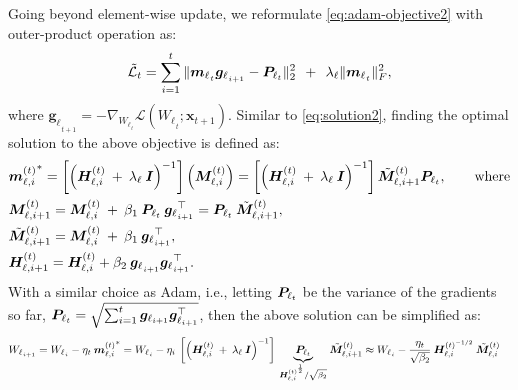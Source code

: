 Going beyond element-wise update, we reformulate \autoref{eq:adam-objective2} with outer-product operation as:
\begin{align}\label{eq:adgrad-objective2}
    \tilde{\mathcal{L}}_t = \sum_{i = 1}^{t} \| {\boldsymbol{m}_{\ell}}_{_{t}}   {\boldsymbol{g}_{\ell}}_{_{i + 1}} - \boldsymbol{P}_{\ell_{t}} \|_{2}^{2} \:\: +\:\: \lambda_{\ell} \|{\boldsymbol{m}_{\ell}}_{_{t}}\|^2_F ,
\end{align}
where ${\boldsymbol{g}_{\ell}}_{_{t + 1}} = - \nabla_{{W_{\ell}}_{_{t}}} \mathcal{L}\left({W_{\ell}}_{_{t}}; \boldsymbol{x}_{t+1}\right)$. Similar to \autoref{eq:solution2}, finding the optimal solution to the above objective is defined as:
\begin{align}\label{eq:solution-adagrad}
    &{\boldsymbol{m}^{(t)}_{\ell, i}}^{*} = \left[  \left( \boldsymbol{H}^{(t)}_{\ell, i} \: + \: \lambda_{\ell}\: \boldsymbol{I} \right)^{-1}\right]  \left( \boldsymbol{M}^{(t)}_{\ell, i}\right) = \left[  \left( \boldsymbol{H}^{(t)}_{\ell, i} \: + \: \lambda_{\ell}\: \boldsymbol{I} \right)^{-1}\right]  \tilde{\boldsymbol{M}}^{(t)}_{\ell, i+1} \boldsymbol{P}_{\ell_{t}}, \qquad \text{where} \\
    &\boldsymbol{M}^{(t)}_{\ell, i+1} = \boldsymbol{M}^{(t)}_{\ell, i} \: + \:  \beta_1 \: \boldsymbol{P}_{\ell_{t}} \: {\boldsymbol{g}_{\ell}}_{_{i + 1}}^{\top}   = \boldsymbol{P}_{\ell_{t}}  \: \tilde{\boldsymbol{M}}^{(t)}_{\ell, i+1}  ,\\
    &\tilde{\boldsymbol{M}}^{(t)}_{\ell, i+1} = \boldsymbol{M}^{(t)}_{\ell, i} \: + \:  \beta_1 \: {\boldsymbol{g}_{\ell}}_{_{i + 1}}^{\top},\\
    &\boldsymbol{H}^{(t)}_{\ell, i+1} = \boldsymbol{H}^{(t)}_{\ell, i} + \beta_2 \: {\boldsymbol{g}_{\ell}}_{_{i + 1}} {\boldsymbol{g}_{\ell}}_{_{i + 1}}^{\top}.
\end{align}
With a similar choice as Adam, i.e., letting $\boldsymbol{P}_{\ell_{t}}$ be the variance of the gradients so far, $\boldsymbol{P}_{\ell_{t}} = \sqrt{\sum_{i = 1}^{t} \boldsymbol{g}_{\ell_{i+1}} \boldsymbol{g}_{\ell_{i+1}}^{\top}}$, then the above solution can be simplified as:
\begin{align}
    &{W_{\ell}}_{_{i+1}} = {W_{\ell}}_{_{i}} - \eta_t \: {\boldsymbol{m}^{(t)}_{\ell, i}}^{*} = {W_{\ell}}_{_{i}} - \eta_i \:  \left[  \left( \boldsymbol{H}^{(t)}_{\ell, i} \: + \: \lambda_{\ell}\: \boldsymbol{I} \right)^{-1}\right] \: \underset{\boldsymbol{H}^{(t)^{\frac{1}{2}}}_{\ell, i} / \sqrt{\beta_2}}{\underbrace{\boldsymbol{P}_{\ell_{t}}}} \: \tilde{\boldsymbol{M}}^{(t)}_{\ell, i+1}   \approx {W_{\ell}}_{_{i}} - \frac{\eta_t}{\sqrt{\beta_2}} \: \boldsymbol{H}^{(t)^{-1/2}}_{\ell, i} \:\tilde{\boldsymbol{M}}^{(t)}_{\ell, i}
\end{align}
